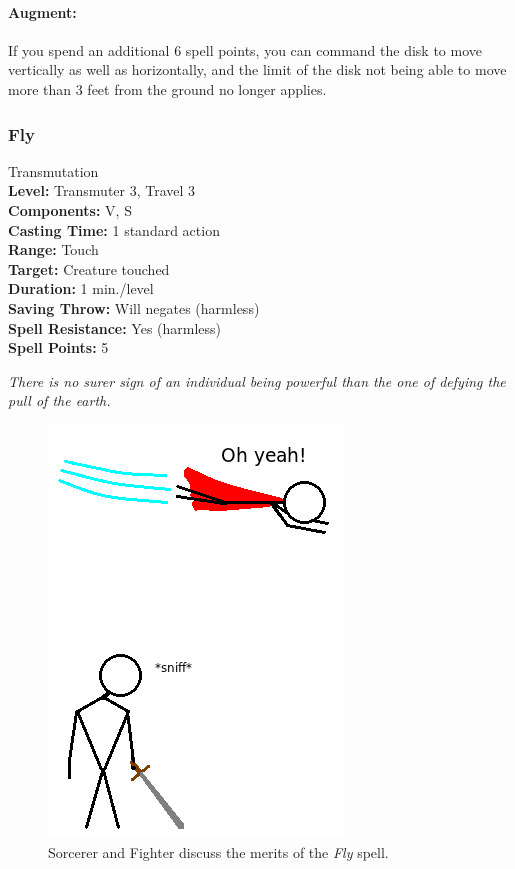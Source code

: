 \paragraph{Augment:} If you spend an additional 6 spell points, you can command the disk to move vertically as well as horizontally, and the limit of
the disk not being able to move more than 3 feet from the ground no longer applies.

\subsubsection{Fly}
\label{Spell:Fly}
Transmutation
\\ \textbf{Level:} Transmuter 3, Travel 3
\\ \textbf{Components:} V, S
\\ \textbf{Casting Time:} 1 standard action
\\ \textbf{Range:} Touch
\\ \textbf{Target:} Creature touched
\\ \textbf{Duration:} 1 min./level
\\ \textbf{Saving Throw:} Will negates (harmless)
\\ \textbf{Spell Resistance:} Yes (harmless)
\\ \textbf{Spell Points:} 5

\emph{There is no surer sign of an individual being powerful than the one of defying the pull of the earth.}

\begin{figure}
  \caption{Sorcerer and Fighter discuss the merits of the \emph{Fly} spell.}
  \centering
    \includegraphics{Pics/Fly.png}
\end{figure}

